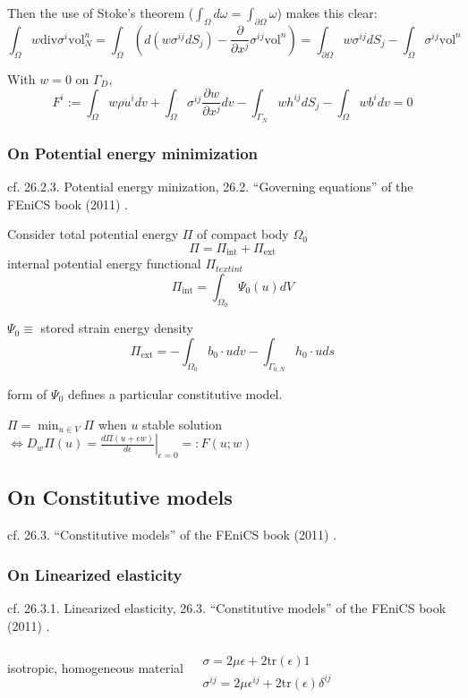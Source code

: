\documentclass[twoside,landscape,10pt]{amsart}
\theoremstyle{plain}
\theoremstyle{definition}
\theoremstyle{remark}
\begin{document}
\begin{multicols*}{2}
Then the use of Stoke's theorem ($\int_{\Omega} d\omega = \int_{\partial \Omega} \omega$) makes this clear:
\[
\int_{\Omega} w \text{div}\sigma^i \text{vol}^n_N = \int_{\Omega} \left( d(w\sigma^{ij} dS_j) - \frac{ \partial }{ \partial x^j} \sigma^{ij} \text{vol}^n \right) = \int_{\partial \Omega} w \sigma^{ij} dS_j - \int_{\Omega} \sigma^{ij} \text{vol}^n
\]

With $w=0$ on $\Gamma_D$, 
\[
F^i:= \int_{\Omega} w \rho \ddot{u}^i dv + \int_{\Omega} \sigma^{ij} \frac{ \partial w}{ \partial x^j} dv - \int_{\Gamma_N} w h^{ij} dS_j - \int_{\Omega} wb^i dv=  0
\]

\subsubsection{On Potential energy minimization}

cf. 26.2.3. Potential energy minization, 26.2. ``Governing equations'' of the FEniCS book (2011) \cite{FEniCS}.  

Consider total potential energy $\Pi$ of compact body $\Omega_0$
\[
\Pi = \Pi_{\text{int}} + \Pi_{\text{ext}}
\]
internal potential energy functional $\Pi_{text{int}}$
\[
\Pi_{\text{int}} = \int_{\Omega_0} \Psi_0(u) dV
\]

$\Psi_0 \equiv $ stored strain energy density
\[
\Pi_{\text{ext}} = -\int_{\Omega_0} b_0 \cdot u dv - \int_{\Gamma_{0,N}} h_0 \cdot u ds
\]

form of $\Psi_0$ defines a particular constitutive model.  

$\Pi = \min_{u\in V} \Pi$ when $u$ stable solution $\Longleftrightarrow  D_w \Pi(u) = \left. \frac{d\Pi(u+\epsilon w) }{ d \epsilon } \right|_{\epsilon = 0} =: F(u;w)$

\subsection{On Constitutive models}

cf. 26.3. ``Constitutive models'' of the FEniCS book (2011) \cite{FEniCS}.  

\subsubsection{On Linearized elasticity}

cf. 26.3.1. Linearized elasticity, 26.3. ``Constitutive models'' of the FEniCS book (2011) \cite{FEniCS}.  

isotropic, homogeneous material $\begin{aligned} & \quad \\
   & \sigma = 2\mu \epsilon + 2\text{tr}(\epsilon)1 \\
  & \sigma^{ij} = 2\mu \epsilon^{ij} + 2\text{tr}(\epsilon) \delta^{ij} \end{aligned}$


\end{multicols*}
\end{document}
